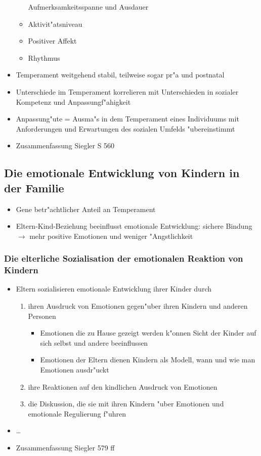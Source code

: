 \begin{itemize}
\begin{itemize}
				Aufmerksamkeitsspanne und Ausdauer
			\item
				Aktivit"atsniveau
			\item
				Positiver Affekt
			\item
				Rhythmus
		\end{itemize}
	\item
		Temperament weitgehend stabil, teilweise sogar pr"a und postnatal
	\item
		Unterschiede im Temperament korrelieren mit Unterschieden in sozialer Kompetenz und Anpassungf"ahigkeit
	\item
		Anpassung"ute = Ausma"s in dem Temperament eines Individuums mit Anforderungen und Erwartungen des sozialen Umfelds "ubereinstimmt
	\item
		Zusammenfassung Siegler S 560
\end{itemize}

\subsection{Die emotionale Entwicklung von Kindern in der Familie}
\begin{itemize}
	\item
		Gene betr"achtlicher Anteil an Temperament
	\item
		Eltern-Kind-Beziehung beeinflusst emotionale Entwicklung: sichere Bindung $\rightarrow$ mehr positive Emotionen und weniger "Angstlichkeit
\end{itemize}

\subsubsection{Die elterliche Sozialisation der emotionalen Reaktion von Kindern}
\begin{itemize}
	\item
		Eltern sozialisieren emotionale Entwicklung ihrer Kinder durch
		\begin{enumerate}
			\item
				ihren Ausdruck von Emotionen gegen"uber ihren Kindern und anderen Personen
				\begin{itemize}
					\item
						Emotionen die zu Hause gezeigt werden k"onnen Sicht der Kinder auf sich selbst und andere beeinflussen
					\item
						Emotionen der Eltern dienen Kindern als Modell, wann und wie man Emotionen ausdr"uckt
				\end{itemize}
			\item
				ihre Reaktionen auf den kindlichen Ausdruck von Emotionen
			\item
				die Diskussion, die sie mit ihren Kindern "uber Emotionen und emotionale Regulierung f"uhren
	\end{enumerate}
\item
	\dots
\item
	Zusammenfassung Siegler 579 ff
\end{itemize}
